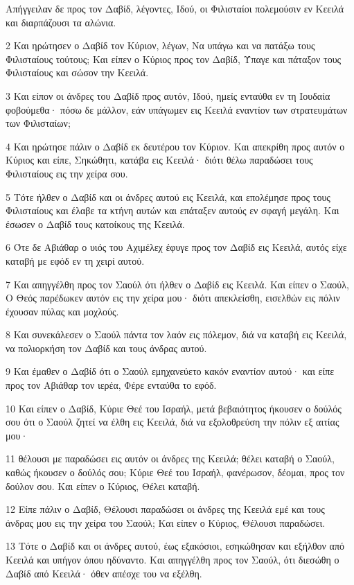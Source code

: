 \par Απήγγειλαν δε προς τον Δαβίδ, λέγοντες, Ιδού, οι Φιλισταίοι πολεμούσιν εν Κεειλά και διαρπάζουσι τα αλώνια.
\par 2 Και ηρώτησεν ο Δαβίδ τον Κύριον, λέγων, Να υπάγω και να πατάξω τους Φιλισταίους τούτους; Και είπεν ο Κύριος προς τον Δαβίδ, Ύπαγε και πάταξον τους Φιλισταίους και σώσον την Κεειλά.
\par 3 Και είπον οι άνδρες του Δαβίδ προς αυτόν, Ιδού, ημείς ενταύθα εν τη Ιουδαία φοβούμεθα· πόσω δε μάλλον, εάν υπάγωμεν εις Κεειλά εναντίον των στρατευμάτων των Φιλισταίων;
\par 4 Και ηρώτησε πάλιν ο Δαβίδ εκ δευτέρου τον Κύριον. Και απεκρίθη προς αυτόν ο Κύριος και είπε, Σηκώθητι, κατάβα εις Κεειλά· διότι θέλω παραδώσει τους Φιλισταίους εις την χείρα σου.
\par 5 Τότε ήλθεν ο Δαβίδ και οι άνδρες αυτού εις Κεειλά, και επολέμησε προς τους Φιλισταίους και έλαβε τα κτήνη αυτών και επάταξεν αυτούς εν σφαγή μεγάλη. Και έσωσεν ο Δαβίδ τους κατοίκους της Κεειλά.
\par 6 Ότε δε Αβιάθαρ ο υιός του Αχιμέλεχ έφυγε προς τον Δαβίδ εις Κεειλά, αυτός είχε καταβή με εφόδ εν τη χειρί αυτού.
\par 7 Και απηγγέλθη προς τον Σαούλ ότι ήλθεν ο Δαβίδ εις Κεειλά. Και είπεν ο Σαούλ, Ο Θεός παρέδωκεν αυτόν εις την χείρα μου· διότι απεκλείσθη, εισελθών εις πόλιν έχουσαν πύλας και μοχλούς.
\par 8 Και συνεκάλεσεν ο Σαούλ πάντα τον λαόν εις πόλεμον, διά να καταβή εις Κεειλά, να πολιορκήση τον Δαβίδ και τους άνδρας αυτού.
\par 9 Και έμαθεν ο Δαβίδ ότι ο Σαούλ εμηχανεύετο κακόν εναντίον αυτού· και είπε προς τον Αβιάθαρ τον ιερέα, Φέρε ενταύθα το εφόδ.
\par 10 Και είπεν ο Δαβίδ, Κύριε Θεέ του Ισραήλ, μετά βεβαιότητος ήκουσεν ο δούλός σου ότι ο Σαούλ ζητεί να έλθη εις Κεειλά, διά να εξολοθρεύση την πόλιν εξ αιτίας μου·
\par 11 θέλουσι με παραδώσει εις αυτόν οι άνδρες της Κεειλά; θέλει καταβή ο Σαούλ, καθώς ήκουσεν ο δούλός σου; Κύριε Θεέ του Ισραήλ, φανέρωσον, δέομαι, προς τον δούλον σου. Και είπεν ο Κύριος, Θέλει καταβή.
\par 12 Είπε πάλιν ο Δαβίδ, Θέλουσι παραδώσει οι άνδρες της Κεειλά εμέ και τους άνδρας μου εις την χείρα του Σαούλ; Και είπεν ο Κύριος, Θέλουσι παραδώσει.
\par 13 Τότε ο Δαβίδ και οι άνδρες αυτού, έως εξακόσιοι, εσηκώθησαν και εξήλθον από Κεειλά και υπήγον όπου ηδύναντο. Και απηγγέλθη προς τον Σαούλ, ότι διεσώθη ο Δαβίδ από Κεειλά· όθεν απέσχε του να εξέλθη.
